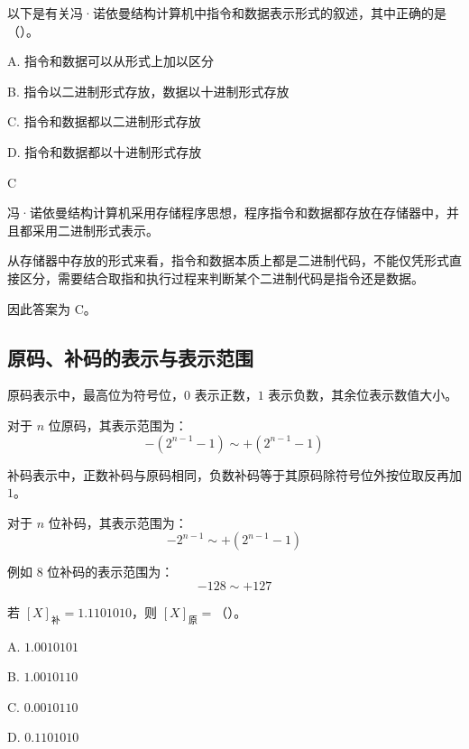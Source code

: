 \begin{question}
以下是有关冯·诺依曼结构计算机中指令和数据表示形式的叙述，其中正确的是（）。

A. 指令和数据可以从形式上加以区分

B. 指令以二进制形式存放，数据以十进制形式存放

C. 指令和数据都以二进制形式存放

D. 指令和数据都以十进制形式存放
\end{question}

\begin{answer}
C
\end{answer}

\begin{analysisenv}
冯·诺依曼结构计算机采用存储程序思想，程序指令和数据都存放在存储器中，并且都采用二进制形式表示。

从存储器中存放的形式来看，指令和数据本质上都是二进制代码，不能仅凭形式直接区分，需要结合取指和执行过程来判断某个二进制代码是指令还是数据。

因此答案为 C。
\end{analysisenv}








\subsection{原码、补码的表示与表示范围}

\begin{knowledge}
原码表示中，最高位为符号位，$0$ 表示正数，$1$ 表示负数，其余位表示数值大小。

对于 $n$ 位原码，其表示范围为：
\[
-(2^{n-1}-1) \sim +(2^{n-1}-1)
\]

补码表示中，正数补码与原码相同，负数补码等于其原码除符号位外按位取反再加 $1$。

对于 $n$ 位补码，其表示范围为：
\[
-2^{n-1} \sim +(2^{n-1}-1)
\]

例如 $8$ 位补码的表示范围为：
\[
-128 \sim +127
\]
\end{knowledge}



\begin{question}
若 $[X]_{\text{补}}=1.1101010$，则 $[X]_{\text{原}}=$（）。

A. $1.0010101$

B. $1.0010110$

C. $0.0010110$

D. $0.1101010$
\end{question}

